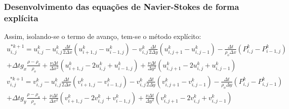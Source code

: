 \documentclass[xcolor=dvipsnames,10pt,aspectratio=169]{beamer}
\begin{document}
	\begin{frame}
		\frametitle{Desenvolvimento das equações de Navier-Stokes  de forma explícita}
		Assim, isolando-se o termo de avanço, tem-se o método explícito:
		\begin{equation}
			\begin{split}
			u_{i , j}^{\ast k + 1} = u_{i , j}^{k} - u_{i , j}^{k}\frac{\Delta t}{2 \Delta x} \left( u_{i + 1 , j}^k - u_{i - 1 , j}^k  \right) - v_{i , j}^{k}\frac{\Delta t }{2 \Delta y} \left(u_{i , j+ 1}^k - u_{i, j-1}^k \right)  -\frac{\Delta t}{\rho_o \Delta x} \left(P_{i, j}^k - P_{i - 1 , j}^k\right)\\ + \Delta t  g_x  \frac{\rho - \rho_o}{\rho_o} + \frac{\nu \Delta t}{\Delta x^2} \left( u_{i+1 , j}^{k} - 2 u_{i,j}^{k} + u_{i-1,j}^{k} \right) + \frac{\nu \Delta t}{\Delta y^2} \left(u_{i , j+1}^{k} - 2 u_{i,j}^{k} + u_{i,j-1}^{k}\right)
			\end{split}
		\end{equation}
		\begin{equation}
			\begin{split}
			v_{i , j}^{\ast k + 1} = v_{i , j}^{k} -u_{i , j}^{k}\frac{\Delta t}{2 \Delta x} \left(v_{i + 1 , j}^k - v_{i - 1 , j}^k\right) - v_{i , j}^{k} \frac{\Delta t}{2 \Delta y} \left(v_{i , j+ 1}^k - v_{i, j-1}^k  \right) -\frac{\Delta t}{\rho_o \Delta y} \left(P_{i , j}^k - P_{i , j - 1}^k\right) \\ + \Delta t g_y  \frac{\rho - \rho_o}{\rho_o} + \frac{\nu \Delta t}{\Delta x^2} \left( v_{i+1 , j}^{k} - 2 v_{i,j}^{k} + v_{i-1,j}^{k} \right) + \frac{\nu \Delta t}{\Delta y^2} \left( v_{i , j+1}^{k} - 2 v_{i,j}^{k} + v_{i,j-1}^{k} \right)
			\end{split}
		\end{equation}
	\end{frame}
\end{document}
